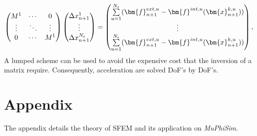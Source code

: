 \documentclass[oneside,11pt,times]{book}
\begin{document}
 \begin{equation}
\label{equationStochasticGalerkinNewtonRaphsonFinalSystem}
\begin{pmatrix}
     {M}^{1}     & \cdots & 0 \\
    \vdots & \ddots & \vdots \\
    0      & \cdots &  {M}^{1}
\end{pmatrix}
\begin{pmatrix}
\Delta{x^{1}_{n+1}} \\
\vdots \\
\Delta{x^{N_{\epsilon}}_{n+1}}
\end{pmatrix}
= \begin{pmatrix}
\sum\limits_{u=1}^{N_{\epsilon}} (\bm{f}^{ext,u}_{n+1} - \bm{f}^{int,u}(\bm{x}^{k,u}_{n+1}))  \\
\vdots \\
\sum\limits_{u=1}^{N_{\epsilon}} (\bm{f}^{ext,u}_{n+1} - \bm{f}^{int,u}(\bm{x}^{k,u}_{n+1}))
\end{pmatrix},\\
\end{equation}
A lumped scheme can be used to avoid the expensive cost that the inversion of a matrix require. Consequently, acceleration are solved DoF's by DoF's.

\section{Appendix}
The appendix details the theory of SFEM and its application on \textit{MuPhiSim}.
\end{document}
